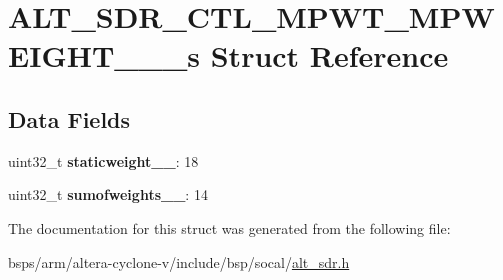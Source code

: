 \hypertarget{structALT__SDR__CTL__MPWT__MPWEIGHT__1__4__s}{}\section{A\+L\+T\+\_\+\+S\+D\+R\+\_\+\+C\+T\+L\+\_\+\+M\+P\+W\+T\+\_\+\+M\+P\+W\+E\+I\+G\+H\+T\+\_\+\_\+\_\+s Struct Reference}
\label{structALT__SDR__CTL__MPWT__MPWEIGHT__1__4__s}
\subsection*{Data Fields}
\begin{DoxyCompactItemize}
\item 
\mbox{\label{structALT__SDR__CTL__MPWT__MPWEIGHT__1__4__s_ace1dde0cdd9e661dd99ee79153124f87}} 
uint32\+\_\+t {\bfseries staticweight\+\_\+\_}\+: 18
\item 
\mbox{\label{structALT__SDR__CTL__MPWT__MPWEIGHT__1__4__s_a8f747372c71d5ac350fd15eebbe27225}} 
uint32\+\_\+t {\bfseries sumofweights\+\_\+\_}\+: 14
\end{DoxyCompactItemize}


The documentation for this struct was generated from the following file\+:\begin{DoxyCompactItemize}
\item 
bsps/arm/altera-\/cyclone-\/v/include/bsp/socal/\mbox{\hyperlink{alt__sdr_8h}{alt\+\_\+sdr.\+h}}\end{DoxyCompactItemize}

